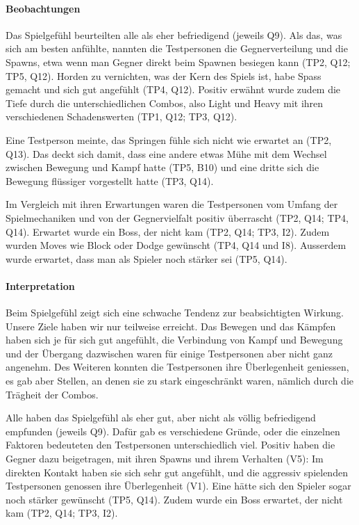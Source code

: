\documentclass[../Main.tex]{subfiles}
\begin{document}
\paragraph{Beobachtungen}
Das Spielgefühl beurteilten alle als eher befriedigend (jeweils Q9). Als das, was sich am besten anfühlte, nannten die Testpersonen die Gegnerverteilung und die Spawns, etwa wenn man Gegner direkt beim Spawnen besiegen kann (TP2, Q12; TP5, Q12). Horden zu vernichten, was der Kern des Spiels ist, habe Spass gemacht und sich gut angefühlt (TP4, Q12). Positiv erwähnt wurde zudem die Tiefe durch die unterschiedlichen Combos, also Light und Heavy mit ihren verschiedenen Schadenswerten (TP1, Q12; TP3, Q12).

Eine Testperson meinte, das Springen fühle sich nicht wie erwartet an (TP2, Q13). Das deckt sich damit, dass eine andere etwas Mühe mit dem Wechsel zwischen Bewegung und Kampf hatte (TP5, B10) und eine dritte sich die Bewegung flüssiger vorgestellt hatte (TP3, Q14).

Im Vergleich mit ihren Erwartungen waren die Testpersonen vom Umfang der Spielmechaniken und von der Gegnervielfalt positiv überrascht (TP2, Q14; TP4, Q14). Erwartet wurde ein Boss, der nicht kam (TP2, Q14; TP3, I2). Zudem wurden Moves wie Block oder Dodge gewünscht (TP4, Q14 und I8). Ausserdem wurde erwartet, dass man als Spieler noch stärker sei (TP5, Q14).

\paragraph{Interpretation}
Beim Spielgefühl zeigt sich eine schwache Tendenz zur beabsichtigten Wirkung. Unsere Ziele haben wir nur teilweise erreicht. Das Bewegen und das Kämpfen haben sich je für sich gut angefühlt, die Verbindung von Kampf und Bewegung und der Übergang dazwischen waren für einige Testpersonen aber nicht ganz angenehm. Des Weiteren konnten die Testpersonen ihre Überlegenheit geniessen, es gab aber Stellen, an denen sie zu stark eingeschränkt waren, nämlich durch die Trägheit der Combos.

Alle haben das Spielgefühl als eher gut, aber nicht als völlig befriedigend empfunden (jeweils Q9). Dafür gab es verschiedene Gründe, oder die einzelnen Faktoren bedeuteten den Testpersonen unterschiedlich viel. Positiv haben die Gegner dazu beigetragen, mit ihren Spawns und ihrem Verhalten (V5): Im direkten Kontakt haben sie sich sehr gut angefühlt, und die aggressiv spielenden Testpersonen genossen ihre Überlegenheit (V1). Eine hätte sich den Spieler sogar noch stärker gewünscht (TP5, Q14). Zudem wurde ein Boss erwartet, der nicht kam (TP2, Q14; TP3, I2).
\end{document}
